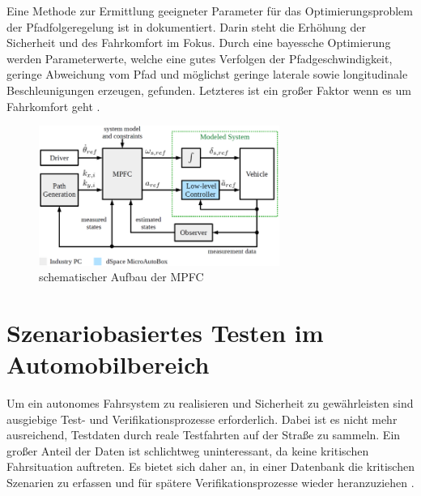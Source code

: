 Eine Methode zur Ermittlung geeigneter Parameter für das Optimierungsproblem der Pfadfolgeregelung ist in \cite{math11020465} dokumentiert. Darin steht die Erhöhung der Sicherheit und des Fahrkomfort im Fokus. Durch eine bayessche Optimierung werden Parameterwerte, welche eine gutes Verfolgen der Pfadgeschwindigkeit, geringe Abweichung vom Pfad und möglichst geringe laterale sowie longitudinale Beschleunigungen erzeugen, gefunden. Letzteres ist ein großer Faktor wenn es um Fahrkomfort geht \cite{BELLEM201890}.
\begin{figure}[H]
    \centering
    \includegraphics[width=0.7\textwidth]{figures/2_Grundlagen/MPFC_Schema.png}
    \caption{schematischer Aufbau der MPFC \cite{ritschel2019}}
    \label{fig:MPFC_Schema}
\end{figure}
    
\section{Szenariobasiertes Testen im Automobilbereich} \label{sec:SoftwaretestsAutomobil}

Um ein autonomes Fahrsystem zu realisieren und Sicherheit zu gewährleisten sind ausgiebige Test- und Verifikationsprozesse erforderlich. Dabei ist es nicht mehr ausreichend, Testdaten durch reale Testfahrten auf der Straße zu sammeln. Ein großer Anteil der Daten ist schlichtweg uninteressant, da keine kritischen Fahrsituation auftreten. Es bietet sich daher an, in einer Datenbank die kritischen Szenarien zu erfassen und für spätere Verifikationsprozesse wieder heranzuziehen \cite{Nalic2020}.

